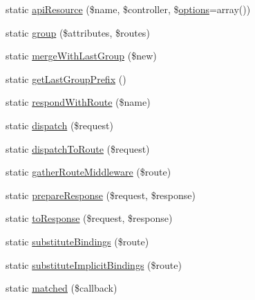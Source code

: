 \begin{DoxyCompactItemize}
\item 
static \mbox{\hyperlink{class_illuminate_1_1_support_1_1_facades_1_1_route_a870a8af5be97776cb08cd19e7681665b}{api\+Resource}} (\$name, \$controller, \$\mbox{\hyperlink{class_illuminate_1_1_support_1_1_facades_1_1_route_a56299381f0cc42d0701d1149d6923d6d}{options}}=array())
\item 
static \mbox{\hyperlink{class_illuminate_1_1_support_1_1_facades_1_1_route_ac33b88549eeaaed8325ee4b479a8c132}{group}} (\$attributes, \$routes)
\item 
static \mbox{\hyperlink{class_illuminate_1_1_support_1_1_facades_1_1_route_a8593864cb4512c462ea6fe2135f97490}{merge\+With\+Last\+Group}} (\$new)
\item 
static \mbox{\hyperlink{class_illuminate_1_1_support_1_1_facades_1_1_route_ac204f4635943e403474495a26cb4cfb6}{get\+Last\+Group\+Prefix}} ()
\item 
static \mbox{\hyperlink{class_illuminate_1_1_support_1_1_facades_1_1_route_ac0573684cafafad11cb8fe7c470a766b}{respond\+With\+Route}} (\$name)
\item 
static \mbox{\hyperlink{class_illuminate_1_1_support_1_1_facades_1_1_route_a861f30796a663e1d1e8982bc7ff9a8b8}{dispatch}} (\$request)
\item 
static \mbox{\hyperlink{class_illuminate_1_1_support_1_1_facades_1_1_route_a22e9a656dbe34e0311a566c90330a3a6}{dispatch\+To\+Route}} (\$request)
\item 
static \mbox{\hyperlink{class_illuminate_1_1_support_1_1_facades_1_1_route_ad8d94099c533eb3f93a4fa0884e69716}{gather\+Route\+Middleware}} (\$route)
\item 
static \mbox{\hyperlink{class_illuminate_1_1_support_1_1_facades_1_1_route_adf6831262c25fa426d81fec205559bcd}{prepare\+Response}} (\$request, \$response)
\item 
static \mbox{\hyperlink{class_illuminate_1_1_support_1_1_facades_1_1_route_a93f7f1fd6665fa39d529aa12ccbec22e}{to\+Response}} (\$request, \$response)
\item 
static \mbox{\hyperlink{class_illuminate_1_1_support_1_1_facades_1_1_route_a5a2a3e65c09e2e548773a5513ae4e9f9}{substitute\+Bindings}} (\$route)
\item 
static \mbox{\hyperlink{class_illuminate_1_1_support_1_1_facades_1_1_route_a8b47baf3e67a44458d5359a653250714}{substitute\+Implicit\+Bindings}} (\$route)
\item 
static \mbox{\hyperlink{class_illuminate_1_1_support_1_1_facades_1_1_route_a5a3bc3b67390be84a837c090d97f8993}{matched}} (\$callback)

\end{DoxyCompactItemize}
